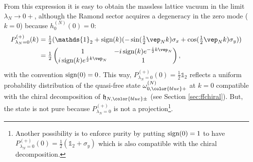 \documentclass[a4paper, 11pt]{article}
\newcommand{\fh}{\mathfrak{h}}
\DeclareMathOperator{\1}{\mathds{1}}
\DeclareMathOperator{\sign}{\textup{sign}}
\begin{document}
From this expression it is easy to obtain the massless lattice vacuum in the limit $\lambda_{N}\rightarrow0+$, although the Ramond sector acquires a degeneracy in the zero mode ($k=0$) because $h^{(N)}_{0}(0) = 0$:
\begin{align}
\label{eq:Fmassless}
P^{(+)}_{\lambda_{N}=0}(k) & = \tfrac{1}{2}(\mathds{1}_{2} + \sign(k)(-\sin(\tfrac{1}{2}\vep_{N}k)\sigma_{x} + \cos(\tfrac{1}{2}\vep_{N}k)\sigma_{y})) \\ \nonumber
 & = \tfrac{1}{2}\begin{pmatrix} 1 & -i\sign(k)e^{-\frac{i}{2}k\vep_{N}} \\ i\sign(k)e^{\frac{i}{2}k\vep_{N}} & 1 \end{pmatrix},
\end{align}
with the convention $\sign(0) = 0$. This way, $P^{(+)}_{\lambda_{N}=0}(0) = \tfrac{1}{2}\mathds{1}_{2}$ reflects a uniform probability distribution of the quasi-free state $\omega^{(N)}_{0,{\color{blue}+}}$ at $k=0$ compatible with the chiral decomposition of $\fh_{N,{\color{blue}\pm}}$ (see Section \ref{sec:ffchiral}). But, the state is not pure because $P^{(+)}_{\lambda_{N}=0}$ is not a projection\footnote{Another possibility is to enforce purity by putting $\sign(0) = 1$ to have $P^{(+)}_{\lambda_{N}=0}(0) = \tfrac{1}{2}(\mathds{1}_{2}+\sigma_{y})$ which is also compatible with the chiral decomposition.}.
\end{document}
